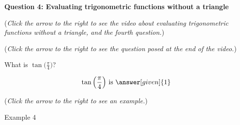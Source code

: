 \documentclass{ximera}
\begin{document}
\textbf{Question 4: Evaluating trigonometric functions
without a triangle}
\begin{question}
\begin{flushright}
{\color{blue}(\emph{Click the arrow to the right to see the video about
evaluating trigonometric functions without a triangle, and the fourth question.})}
\end{flushright}
\begin{center}
\begin{expandable}
{\color{blue}(\emph{Click the arrow to the right to see the  question
posed at the end of the video.})}
\begin{expandable}
What is $\tan\Big(\frac{\pi}{4}\Big)$?
\begin{prompt}
\[
\tan\Big(\frac{\pi}{4}\Big)\text{ is }\answer[given]{1}
\]
\end{prompt}
\begin{flushright}
{\color{blue}(\emph{Click the arrow to the right to see an example.})}
\end{flushright}
\begin{expandable}
Example 4
\end{expandable}
\end{expandable}
\end{expandable}
\end{center}
\end{question}
\end{document}
